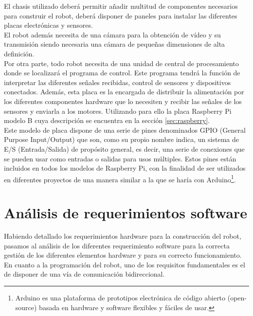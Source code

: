 El chasis utilizado deberá permitir añadir multitud de componentes necesarios para construir el robot, deberá disponer de paneles para instalar las diferentes
placas electrónicas y sensores.\\

El robot además necesita de una cámara para la obtención de vídeo y su transmisión siendo necesaria una cámara de pequeñas dimensiones de alta definición.\\

Por otra parte, todo robot necesita de una unidad de central de procesamiento donde se localizará el programa de control. Este programa tendrá la función de interpretar las diferentes señales recibidas,
control de sensores y dispositivos conectados. Además, esta placa es la encargada de distribuir la alimentación por los diferentes componentes hardware que lo necesiten y recibir las señales de
los sensores y enviarla a los motores. Utilizando para ello la placa Raspberry Pi modelo B cuya descripción se encuentra en la sección \ref{sec:raspberry}.\\

Este modelo de placa dispone de  una serie de pines denominados GPIO (General Purpose Input/Output) que son, como su propio nombre indica, un sistema de E/S (Entrada/Salida) de propósito general,
es decir, una serie de conexiones que se pueden usar como entradas o salidas para usos múltiples. Estos pines están incluidos en todos los modelos de Raspberry Pi, con la
finalidad de ser utilizados en diferentes proyectos de una manera similar a la que se haría con Arduino\footnote{Arduino es una plataforma de prototipos electrónica de código abierto (open-source) 
basada en hardware y software flexibles y fáciles de usar.}.

\section{Análisis de requerimientos software}

Habiendo detallado los requerimientos hardware para la construcción del robot, pasamos al análisis de los diferentes requerimiento software para la correcta
gestión de los diferentes elementos hardware y para su correcto funcionamiento.\\

En cuanto a la programación del robot, uno de los requisitos fundamentales es el de disponer de una vía de comunicación bidireccional.\\

